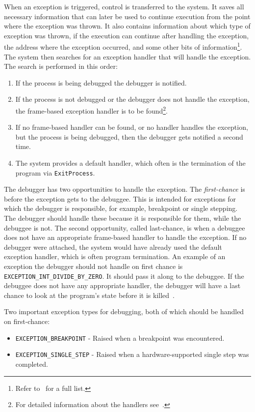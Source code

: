 When an exception is triggered, control is transferred to the system. It saves
all necessary information that can later be used to continue execution from the
point where the exception was thrown. It also contains information about which
type of exception was thrown, if the execution can continue after handling the
exception, the address where the exception occurred, and some other bits of
information\footnote{Refer to~\cite{windows-msdn-seh} for a full list.}. The
system then searches for an exception handler that will handle the exception.
The search is performed in this order:

\begin{enumerate}
    \item If the process is being debugged the debugger is notified.
    \item If the process is not debugged or the debugger does not handle the
        exception, the frame-based exception handler is to be
        found\footnote{For detailed information about the handlers
        see~\cite{windows-msdn-seh}.}.
    \item If no frame-based handler can be found, or no handler handles the
        exception, but the process is being debugged, then the debugger gets
        notified a second time.
    \item The system provides a default handler, which often is the termination of
        the program via \texttt{ExitProcess}.
\end{enumerate}
The debugger has two opportunities to handle the exception. The
\textit{first-chance} is before the exception gets to the debuggee. This is
intended for exceptions for which the debugger is responsible, for example,
breakpoint or single stepping. The debugger should handle these because it is
responsible for them, while the debuggee is not. The second opportunity, called
last-chance, is when a debuggee does not have an appropriate frame-based
handler to handle the exception. If no debugger were attached, the system would
have already used the default exception handler, which is often program
termination. An example of an exception the debugger should not handle on first
chance is \verb|EXCEPTION_INT_DIVIDE_BY_ZERO|. It should pass it along to the
debuggee. If the debuggee does not have any appropriate handler, the debugger
will have a last chance to look at the program's state before it is
killed~\cite{windows-msdn-dbg-exc-handling}.

Two important exception types for debugging, both of which should be handled on
first-chance:
\begin{itemize}
    \item \texttt{EXCEPTION\_BREAKPOINT} - Raised when a breakpoint was encountered.
    \item \texttt{EXCEPTION\_SINGLE\_STEP} - Raised when a hardware-supported
        single step was completed.
\end{itemize}

